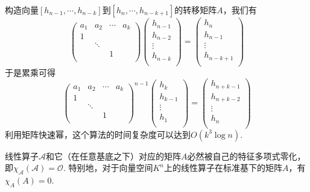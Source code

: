 \begin{algorithm}[朴素的矩阵快速幂方法]
	构造向量$[h_{n-1},\cdots,h_{n-k}]$到$[h_n,\cdots,h_{n-k+1}]$的转移矩阵$A$，我们有
	$$
	\begin{pmatrix}
		a_1 & a_2 & \cdots & a_k\\
		1 & & & \\
		& \ddots & & \\
		& & 1 & \\
	\end{pmatrix}
	\begin{pmatrix}
		h_{n-1}\\
		h_{n-2}\\
		\vdots\\
		h_{n-k}\\
	\end{pmatrix}=
	\begin{pmatrix}
		h_n\\
		h_{n-1}\\
		\vdots\\
		h_{n-k+1}\\
	\end{pmatrix}
	$$
	于是累乘可得
	$$
	\begin{pmatrix}
		a_1 & a_2 & \cdots & a_k\\
		1 & & & \\
		& \ddots & & \\
		& & 1 & \\
	\end{pmatrix}^{n-1}
	\begin{pmatrix}
		h_k\\
		h_{k-1}\\
		\vdots\\
		h_1\\
	\end{pmatrix}=
	\begin{pmatrix}
		h_{n+k-1}\\
		h_{n+k-2}\\
		\vdots\\
		h_{n}\\
	\end{pmatrix}
	$$
	利用矩阵快速幂，这个算法的时间复杂度可以达到$O(k^3\log n)$.
	\label{matdpnoob}
\end{algorithm}

\begin{theorem}
	线性算子$\mathcal{A}$和它（在任意基底之下）对应的矩阵$A$必然被自己的特征多项式零化，即$\chi_{\mathcal A}(\mathcal A)=\mathcal{O}$. 特别地，对于向量空间$K^n$上的线性算子在标准基下的矩阵$A$，有$\chi_A(A)=0$.
\end{theorem}

